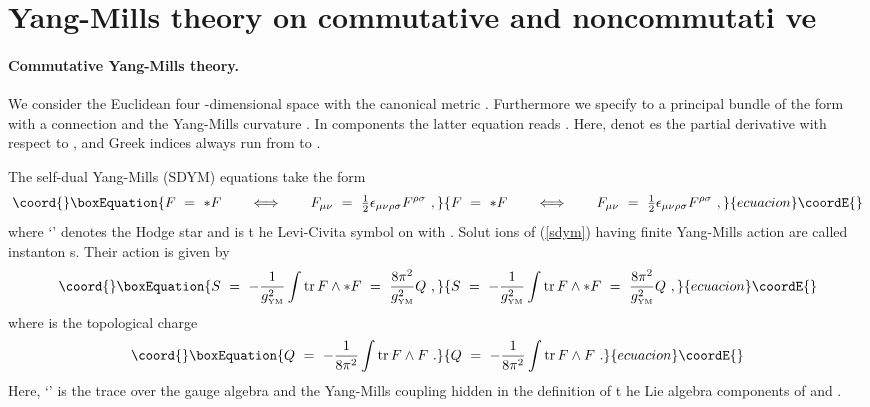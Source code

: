 \documentclass[a4paper,11pt,english]{article}
\numberwithin{equation}{section}
\providecommand{\D}[1]{\operatorname{d#1}}
\providecommand{\tr}[1]{\operatorname{tr}#1}
\providecommand{\sfrac}[2]{{\textstyle\frac{#1}{#2}}}
\renewcommand{\=}{\ =\ }
\begin{document}

\section{Yang-Mills theory on commutative \coordHE{} and noncommutati%
ve \coordHE{}}

\paragraph{Commutative Yang-Mills theory.} We consider the Euclidean four%
-dimensional space \coordHE{} with the canonical metric \myHighlight{$\delta_{\mu
\nu}$}\coordHE{}. Furthermore we specify to a principal bundle of the form \coordHE{} with a connection \myHighlight{${A}={A}_{\mu}\D{x^%
\mu}$}\coordHE{} and the Yang-Mills curvature \myHighlight{${F}=\D{}{A}+%
{A}\wedge{A}$}\coordHE{}. In components the latter equation reads \coordHE{}. Here, \myHighlight{$\partial_{\mu}$}\coordHE{} denot%
es the partial derivative with respect to \coordHE{}, and Greek 
indices always run from \coordHE{} to \coordHE{}.

The self-dual Yang-Mills (SDYM) equations take the form
\begin{equation}\coord{}\boxEquation{\label{sdym}
 {F}\=*{F}\qquad\Longleftrightarrow\qquad{F}_{\mu\nu
}\=\sfrac{1}{2}\epsilon_{\mu\nu\rho\sigma}{F}^{\rho\sigma}\ ,
}{{F}\=*{F}\qquad\Longleftrightarrow\qquad{F}_{\mu\nu
}\=\sfrac{1}{2}\epsilon_{\mu\nu\rho\sigma}{F}^{\rho\sigma}\ ,
}{ecuacion}\coordE{}\end{equation}
where `\myHighlight{$*$}\coordHE{}' denotes the Hodge star and \myHighlight{$\epsilon_{\mu\nu\rho\sigma}$}\coordHE{} is t%
he Levi-Civita symbol on \coordHE{} with \coordHE{}. Solut%
ions of (\ref{sdym}) having finite Yang-Mills action are called instanton%
s. Their action is given by
\begin{equation}\coord{}\boxEquation{\label{action}
 S \= -\frac{1}{g^2_{\text{\tiny YM}}}\int\tr {F}\wedge{*
{F}}\=\frac{8\pi^2}{g^2_{\text{\tiny YM}}}Q\ ,
}{S \= -\frac{1}{g^2_{\text{\tiny YM}}}\int\tr {F}\wedge{*
{F}}\=\frac{8\pi^2}{g^2_{\text{\tiny YM}}}Q\ ,
}{ecuacion}\coordE{}\end{equation}
where \coordHE{} is the topological charge
\begin{equation}\coord{}\boxEquation{
 Q \= -\frac{1}{8\pi^2}\int\tr {F}\wedge{F}\ .
}{
 Q \= -\frac{1}{8\pi^2}\int\tr {F}\wedge{F}\ .
}{ecuacion}\coordE{}\end{equation}
Here, `\myHighlight{$\tr$}\coordHE{}' is the trace over the \coordHE{} gauge algebra and \coordHE{} the Yang-Mills coupling hidden in the definition of t%
he Lie algebra components of \coordHE{} and \coordHE{}.
\end{document}
